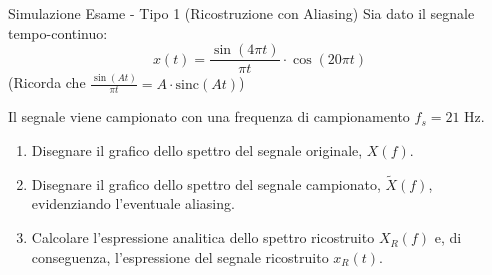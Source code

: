 
\begin{esercizio}{Simulazione Esame - Tipo 1 (Ricostruzione con Aliasing)}
    Sia dato il segnale tempo-continuo:
    \[
        x(t) = \frac{\sin(4\pi t)}{\pi t} \cdot \cos(20\pi t)
    \]
    (Ricorda che $\frac{\sin(At)}{\pi t} = A \cdot \text{sinc}(At)$)
    
    Il segnale viene campionato con una frequenza di campionamento $f_s = 21$ Hz.
    
    \begin{enumerate}
        \item Disegnare il grafico dello spettro del segnale originale, $X(f)$.
        \item Disegnare il grafico dello spettro del segnale campionato, $\tilde{X}(f)$, evidenziando l'eventuale aliasing.
        \item Calcolare l'espressione analitica dello spettro ricostruito $X_R(f)$ e, di conseguenza, l'espressione del segnale ricostruito $x_R(t)$.
    \end{enumerate}
\end{esercizio}